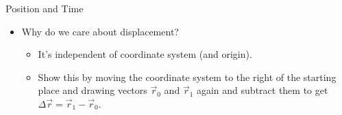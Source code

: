 \documentclass{beamer}
\begin{document}
\begin{frame}{Position and Time}
\begin{itemize}
   \item Why do we care about displacement?
   \begin{itemize}
      \item<2-> It's independent of coordinate system (and origin).
      \item<2-> Show this by moving the coordinate system to the right of the starting place and drawing vectors $\vec{r}_0$ and $\vec{r}_1$ again and subtract them to get $\Delta \vec{r} = \vec{r}_1 - \vec{r}_0$.
   \end{itemize}
\end{itemize}
\begin{center}
\end{center}
\end{frame}
\end{document}
